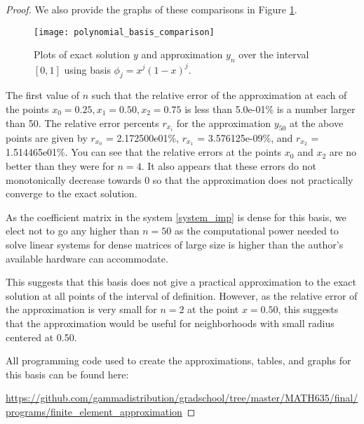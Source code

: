 \begin{proof}
  We also provide the graphs of these comparisons in Figure \ref{poly_plot}.

  \begin{figure}[h!]
    \begin{center}
      \texttt{[image: polynomial\_basis\_comparison]}
    \end{center}
    \caption{Plots of exact solution $y$ and approximation $y_n$ over the interval $[0, 1]$
       using basis $\phi_j = x^j(1-x)^j$.}\label{poly_plot}
  \end{figure}

  The first value of $n$ such that the relative error of the approximation at
  each of the points $x_0=0.25, x_1=0.50, x_2=0.75$ is less than 5.0e-01\% is a number larger than 50.
  The relative error percents $r_{x_i}$ for the approximation $y_{50}$ at the above points are given by $r_{x_0}$ = 2.172500e01\%,
  $r_{x_1}$ = 3.576125e-09\%, and $r_{x_2}$ = 1.514465e01\%. You can see that the relative errors at the points $x_0$ and $x_2$ are no
  better than they were for $n=4$. It also appears that these errors do not monotonically decrease towards 0 so that the
  approximation does not practically converge to the exact solution.

  As the coefficient matrix in the system \eqref{system_imp} is dense for this basis,
  we elect not to go any higher than $n=50$ as the computational power needed to solve
  linear systems for dense matrices of large size is higher than
  the author's available hardware can accommodate.

  This suggests that this basis does not give a practical
  approximation to the exact solution at all points of the interval of definition.
  However, as the relative error of the approximation is very small for $n=2$
  at the point $x=0.50$, this suggests that the approximation would be useful
  for neighborhoods with small radius centered at 0.50.

  All programming code used to create the approximations, tables, and graphs
  for this basis can be found here:

  \url{https://github.com/gammadistribution/gradschool/tree/master/MATH635/final/programs/finite_element_approximation}

\end{proof}